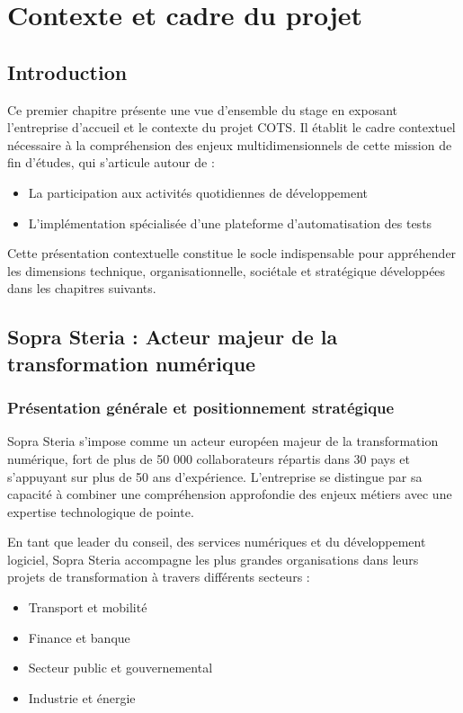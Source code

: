 \chapter{Contexte et cadre du projet}

\section{Introduction}

Ce premier chapitre présente une vue d'ensemble du stage en exposant l'entreprise d'accueil et le contexte du projet COTS. Il établit le cadre contextuel nécessaire à la compréhension des enjeux multidimensionnels de cette mission de fin d'études, qui s'articule autour de :
\begin{itemize}
    \item La participation aux activités quotidiennes de développement
    \item L'implémentation spécialisée d'une plateforme d'automatisation des tests
\end{itemize}

Cette présentation contextuelle constitue le socle indispensable pour appréhender les dimensions technique, organisationnelle, sociétale et stratégique développées dans les chapitres suivants.

\section{Sopra Steria : Acteur majeur de la transformation numérique}

\subsection{Présentation générale et positionnement stratégique}

Sopra Steria s'impose comme un acteur européen majeur de la transformation numérique, fort de plus de 50 000 collaborateurs répartis dans 30 pays et s'appuyant sur plus de 50 ans d'expérience. L'entreprise se distingue par sa capacité à combiner une compréhension approfondie des enjeux métiers avec une expertise technologique de pointe.

En tant que leader du conseil, des services numériques et du développement logiciel, Sopra Steria accompagne les plus grandes organisations dans leurs projets de transformation à travers différents secteurs :
\begin{itemize}
    \item Transport et mobilité
    \item Finance et banque
    \item Secteur public et gouvernemental
    \item Industrie et énergie
\end{itemize}


